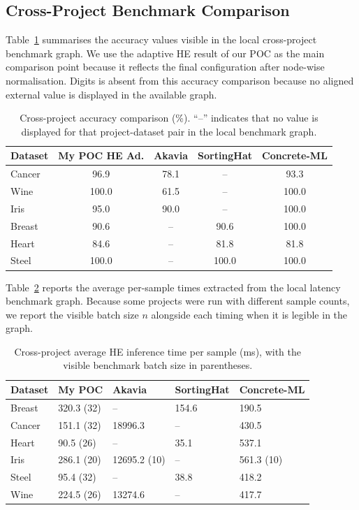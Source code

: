 \documentclass[runningheads]{llncs}
\begin{document}
\subsection{Cross-Project Benchmark Comparison}

Table~\ref{tab:benchmark_accuracy_results} summarises the accuracy values
visible in the local cross-project benchmark graph.  We use the adaptive HE
result of our POC as the main comparison point because it reflects the final
configuration after node-wise normalisation.  Digits is absent from this
accuracy comparison because no aligned external value is displayed in the
available graph.

\begin{table}[t]
\centering
\caption{Cross-project accuracy comparison (\%).  ``--'' indicates that no
value is displayed for that project-dataset pair in the local benchmark
graph.}
\label{tab:benchmark_accuracy_results}
\footnotesize
\begin{tabular}{@{}l c c c c@{}}
\toprule
Dataset & My POC HE Ad. & Akavia & SortingHat & Concrete-ML \\
\midrule
Cancer & 96.9 & 78.1 & --   & 93.3 \\
Wine   & 100.0 & 61.5 & --   & 100.0 \\
Iris   & 95.0 & 90.0 & --   & 100.0 \\
Breast & 90.6 & --   & 90.6 & 100.0 \\
Heart  & 84.6 & --   & 81.8 & 81.8 \\
Steel  & 100.0 & --   & 100.0 & 100.0 \\
\bottomrule
\end{tabular}
\normalsize
\end{table}

Table~\ref{tab:benchmark_latency_results} reports the average per-sample
times extracted from the local latency benchmark graph.  Because some
projects were run with different sample counts, we report the visible batch
size $n$ alongside each timing when it is legible in the graph.

\begin{table}[t]
\centering
\caption{Cross-project average HE inference time per sample (ms), with the
visible benchmark batch size in parentheses.}
\label{tab:benchmark_latency_results}
\footnotesize
\begin{tabular}{@{}p{1.5cm} p{2.2cm} p{2.2cm} p{2.2cm} p{2.2cm}@{}}
\toprule
Dataset & My POC & Akavia & SortingHat & Concrete-ML \\
\midrule
Breast & 320.3 (32) & -- & 154.6 & 190.5 \\
Cancer & 151.1 (32) & 18996.3 & -- & 430.5 \\
Heart  & 90.5 (26) & -- & 35.1 & 537.1 \\
Iris   & 286.1 (20) & 12695.2 (10) & -- & 561.3 (10) \\
Steel  & 95.4 (32) & -- & 38.8 & 418.2 \\
Wine   & 224.5 (26) & 13274.6 & -- & 417.7 \\
\bottomrule
\end{tabular}
\normalsize
\end{table}
\end{document}
